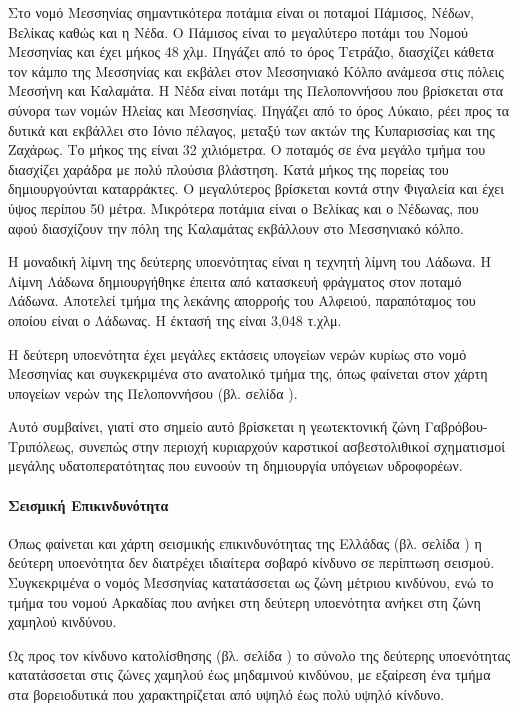 \documentclass[12pt]{article}
\begin{document}
	Στο νομό Μεσσηνίας σημαντικότερα ποτάμια είναι οι ποταμοί Πάμισος, Νέδων, Βελίκας καθώς και η Νέδα. Ο Πάμισος είναι το μεγαλύτερο ποτάμι του Νομού Μεσσηνίας και έχει μήκος 48 χλμ. Πηγάζει από το όρος Τετράζιο, διασχίζει κάθετα τον κάμπο της Μεσσηνίας και εκβάλει στον Μεσσηνιακό Κόλπο ανάμεσα στις πόλεις Μεσσήνη και Καλαμάτα. Η Νέδα είναι ποτάμι της Πελοποννήσου που βρίσκεται στα σύνορα των νομών Ηλείας και Μεσσηνίας. Πηγάζει από το όρος Λύκαιο, ρέει προς τα δυτικά και εκβάλλει στο Ιόνιο πέλαγος, μεταξύ των ακτών της Κυπαρισσίας και της Ζαχάρως. Το μήκος της είναι 32 χιλιόμετρα. Ο ποταμός σε ένα μεγάλο τμήμα του διασχίζει χαράδρα με πολύ πλούσια βλάστηση. Κατά μήκος της πορείας του δημιουργούνται καταρράκτες. Ο μεγαλύτερος βρίσκεται κοντά στην Φιγαλεία και έχει ύψος περίπου 50 μέτρα. Μικρότερα ποτάμια είναι ο Βελίκας και ο Νέδωνας, που αφού διασχίζουν την πόλη της Καλαμάτας εκβάλλουν στο Μεσσηνιακό κόλπο.
	
	Η μοναδική λίμνη της δεύτερης υποενότητας είναι η τεχνητή λίμνη του Λάδωνα. Η Λίμνη Λάδωνα δημιουργήθηκε έπειτα από κατασκευή φράγματος στον ποταμό Λάδωνα. Αποτελεί τμήμα της λεκάνης απορροής του Αλφειού, παραπόταμος του οποίου είναι ο Λάδωνας. Η έκτασή της είναι 3,048 τ.χλμ.
	
	Η δεύτερη υποενότητα έχει μεγάλες εκτάσεις υπογείων νερών κυρίως στο νομό Μεσσηνίας και συγκεκριμένα στο ανατολικό τμήμα της, όπως φαίνεται στον χάρτη υπογείων νερών της Πελοποννήσου (βλ. σελίδα \pageref{ypogeia}).
	
	Αυτό συμβαίνει, γιατί στο σημείο αυτό βρίσκεται η γεωτεκτονική ζώνη Γαβρόβου-Τριπόλεως, συνεπώς στην περιοχή κυριαρχούν καρστικοί ασβεστολιθικοί σχηματισμοί μεγάλης υδατοπερατότητας που ευνοούν τη δημιουργία υπόγειων υδροφορέων.
	
	\paragraph{Σεισμική Επικινδυνότητα}
	
	Όπως φαίνεται και χάρτη σεισμικής επικινδυνότητας της Ελλάδας (βλ. σελίδα \pageref{seismiki}) η δεύτερη υποενότητα δεν διατρέχει ιδιαίτερα σοβαρό κίνδυνο σε περίπτωση σεισμού. Συγκεκριμένα ο νομός Μεσσηνίας κατατάσσεται ως ζώνη μέτριου κινδύνου, ενώ το τμήμα του νομού Αρκαδίας που ανήκει στη δεύτερη υποενότητα ανήκει στη ζώνη χαμηλού κινδύνου.
	
	Ως προς τον κίνδυνο κατολίσθησης (βλ. σελίδα \pageref{katolisthiseis}) το σύνολο της δεύτερης υποενότητας κατατάσσεται στις ζώνες χαμηλού έως μηδαμινού κινδύνου, με εξαίρεση ένα τμήμα στα βορειοδυτικά που χαρακτηρίζεται από υψηλό έως πολύ υψηλό κίνδυνο.
	
\end{document}
